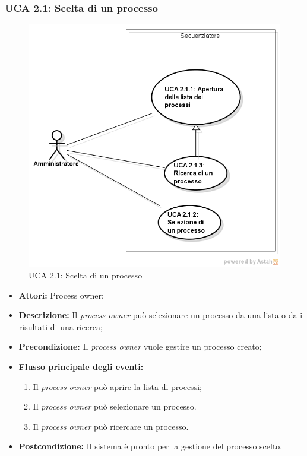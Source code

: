 \subsubsection{UCA 2.1: Scelta di un processo}
\begin{figure}[H]
\centering
\includegraphics[trim=0cm 0.8cm 0cm 0cm,clip=true,width=%
\textwidth]
{./grafici/A21}
\caption{UCA 2.1: Scelta di un processo}
\end{figure}
\begin{itemize}
\item \textbf{Attori:} Process owner;
\item \textbf{Descrizione:} Il \textit{process owner} può selezionare un processo da una lista o da i risultati di una ricerca;
\item \textbf{Precondizione:} Il \textit{process owner} vuole gestire un processo creato;
\item \textbf{Flusso principale degli eventi:}
\begin{enumerate}
\item Il \textit{process owner} può aprire la lista di processi;
\item Il \textit{process owner} può selezionare un processo.
\item Il \textit{process owner} può ricercare un processo.
\end{enumerate}
\item \textbf{Postcondizione:} Il sistema è pronto per la gestione del processo scelto.
\end{itemize}


